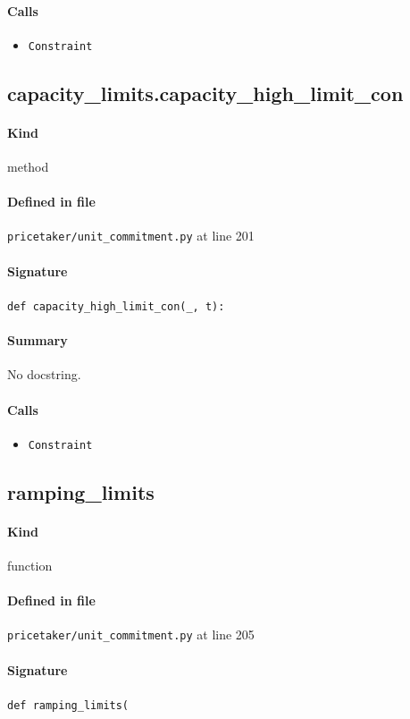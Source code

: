 \documentclass[11pt]{report}
\begin{document}
\paragraph{Calls}
\begin{itemize}[leftmargin=*]
  \item \texttt{Constraint}
\end{itemize}
\subsection{capacity\_limits.capacity\_high\_limit\_con}
\label{def:pricetaker-unit_commitment.py:capacity_limits.capacity_high_limit_con:L201}
\paragraph{Kind} method
\paragraph{Defined in file} \texttt{pricetaker/unit\_commitment.py} at line 201
\paragraph{Signature} \texttt{def capacity\_high\_limit\_con(\_, t):}
\paragraph{Summary} No docstring.
\paragraph{Calls}
\begin{itemize}[leftmargin=*]
  \item \texttt{Constraint}
\end{itemize}
\subsection{ramping\_limits}
\label{def:pricetaker-unit_commitment.py:ramping_limits:L205}
\paragraph{Kind} function
\paragraph{Defined in file} \texttt{pricetaker/unit\_commitment.py} at line 205
\paragraph{Signature} \texttt{def ramping\_limits(}
\end{document}
